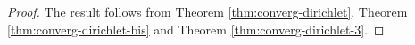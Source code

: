 \documentclass[12pt, reqno]{amsart}%
\theoremstyle{plain}  %
\theoremstyle{definition}  %
\numberwithin{equation}{section}
\begin{document}
\begin{proof}
The result follows from Theorem \ref{thm:converg-dirichlet}, Theorem \ref{thm:converg-dirichlet-bis} and Theorem \ref{thm:converg-dirichlet-3}.
\end{proof}


\vspace{1mm}

\vspace{1mm}
\end{document}
